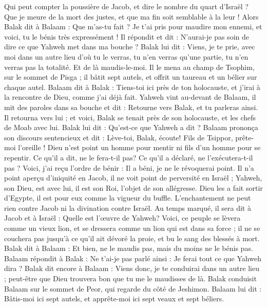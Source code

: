 \begin{multicols}{2}
Qui peut compter la poussière de Jacob, et dire le nombre du quart d'Israël ? Que je meure de la mort des justes, et que ma fin soit semblable à la leur !
Alors Balak dit à Balaam : Que m'as-tu fait ? Je t'ai pris pour maudire mon ennemi, et voici, tu le bénis très expressément !
Il répondit et dit : N’aurai-je pas soin de dire ce que Yahweh met dans ma bouche ?
Balak lui dit : Viens, je te prie, avec moi dans un autre lieu d'où tu le verras, tu n’en verras qu’une partie, tu n’en verras pas la totalité. Et de là maudis-le-moi.
Il le mena au champ de Tsophim, sur le sommet de Pisga ; il bâtit sept autels, et offrit un taureau et un bélier sur chaque autel.
Balaam dit à Balak : Tiens-toi ici près de ton holocauste, et j’irai à la rencontre de Dieu, comme j'ai déjà fait.
Yahweh vint au-devant de Balaam, il mit des paroles dans sa bouche et dit : Retourne vers Balak, et tu parleras ainsi.
Il retourna vers lui ; et voici, Balak se tenait près de son holocauste, et les chefs de Moab avec lui. Balak lui dit : Qu'est-ce que Yahweh a dit ?
Balaam prononça son discours sentencieux et dit : Lève-toi, Balak, écoute! Fils de Tsippor, prête-moi l'oreille !
Dieu n'est point un homme pour mentir ni fils d'un homme pour se repentir. Ce qu’il a dit, ne le fera-t-il pas? Ce qu’il a déclaré, ne l’exécutera-t-il pas ?
Voici, j'ai reçu l’ordre de bénir : Il a béni, je ne le révoquerai point.
Il n'a point aperçu d'iniquité en Jacob, il ne voit point de perversité en Israël ; Yahweh, son Dieu, est avec lui, il est son Roi, l’objet de son allégresse.
Dieu les a fait sortir d'Egypte, il est pour eux comme la vigueur du buffle.
L'enchantement ne peut rien contre Jacob ni la divination contre Israël. Au temps marqué, il sera dit à Jacob et à Israël : Quelle est l’œuvre de Yahweh?
Voici, ce peuple se lèvera comme un vieux lion, et se dressera comme un lion qui est dans sa force ; il ne se couchera pas jusqu’à ce qu’il ait dévoré la proie, et bu le sang des blessés à mort.
Balak dit à Balaam : Et bien, ne le maudis pas, mais du moins ne le bénis pas.
Balaam répondit à Balak : Ne t’ai-je pas parlé ainsi : Je ferai tout ce que Yahweh dira ?
Balak dit encore à Balaam : Viens donc, je te conduirai dans un autre lieu ; peut-être que Dieu trouvera bon que tu me le maudisses de là.
Balak conduisit Balaam sur le sommet de Peor, qui regarde du côté de Jeshimon.
Balaam lui dit : Bâtis-moi ici sept autels, et apprête-moi ici sept veaux et sept béliers.

\end{multicols}

